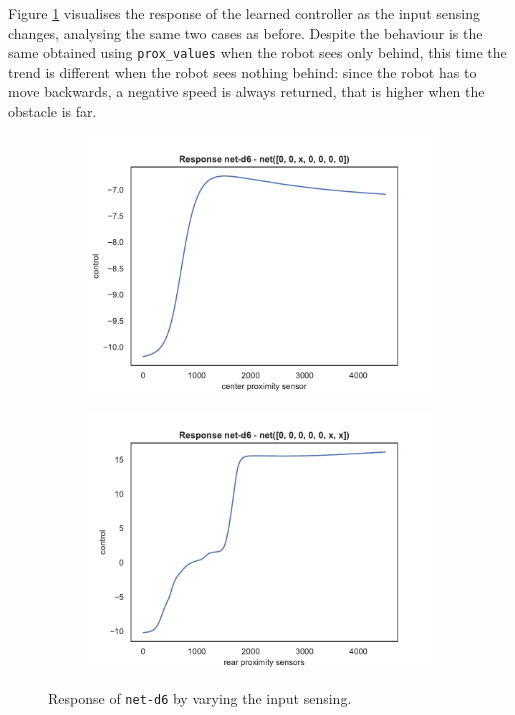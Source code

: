 Figure \ref{fig:net-d6responsesensors} visualises the response of the learned 
controller as the input sensing changes, analysing the same two cases as before. 
Despite the behaviour is the same obtained using \texttt{prox\_values} when the 
robot sees only behind, this time the trend is different when the robot sees 
nothing behind: since the robot has to move backwards, a negative speed is 
always returned, that is higher when the obstacle is far. 
\begin{figure}[!htb]
	\centering
	\begin{subfigure}[h]{0.49\textwidth}
		\centering
		\includegraphics[width=\textwidth]{contents/images/net-d6/response-net-d6-front}%
	\end{subfigure}
	\hfill
	\begin{subfigure}[h]{0.49\textwidth}
		\centering
		\includegraphics[width=\textwidth]{contents/images/net-d6/response-net-d6-rear}
	\end{subfigure}
	\caption{Response of \texttt{net-d6} by varying the input sensing.}
	\label{fig:net-d6responsesensors}
\end{figure}


